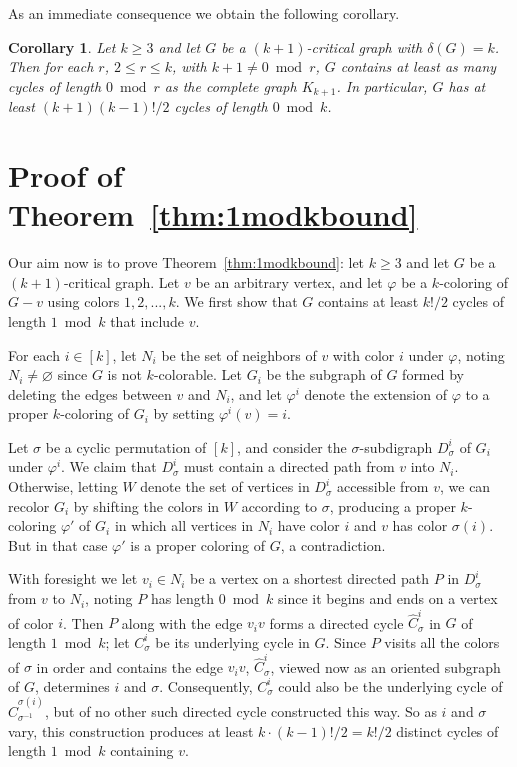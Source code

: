 \documentclass[12pt]{article}
\numberwithin{theorem}{section}
\newtheorem{corollary}[theorem]{Corollary}
\begin{document}
    As an immediate consequence we obtain the following corollary.

\begin{corollary}
\label{cor:0modkwithmindeg}
    Let $k \ge 3$ and let $G$ be a $(k+1)$-critical graph with $\delta (G) = k$. Then for each $r$, $2 \le r \le k$, with $k+1 \ne 0 \bmod r$, $G$ contains at least as many cycles of length $0\bmod r$ as the complete graph $K_{k+1}$.  In particular, $G$ has at least $(k+1)(k-1)!/2$ cycles of length $0 \bmod k$.
\end{corollary}




\section{Proof of Theorem~\ref{thm:1modkbound}}
\label{sec:1modk}

Our aim now is to prove Theorem~\ref{thm:1modkbound}: let $k \ge 3$ and let $G$ be a $(k+1)$-critical graph.  Let $v$ be an arbitrary vertex, and let $\varphi$ be a $k$-coloring of $G-v$ using colors $1,2,...,k$. We first show that $G$ contains at least $k!/2$ cycles of length $1 \bmod k$ that include $v$.

For each $i \in [k]$, let $N_i$ be the set of neighbors of $v$ with color $i$ under $\varphi$, noting $N_i \ne \varnothing$ since $G$ is not $k$-colorable. Let $G_i$ be the subgraph of $G$ formed by deleting the edges between $v$ and $N_i$, and let $\varphi^i$ denote the extension of $\varphi$ to a proper $k$-coloring of $G_i$ by setting $\varphi^i(v)=i$.

Let $\sigma$ be a cyclic permutation of $[k]$, and consider the $\sigma$-subdigraph $D^i_{\sigma}$ of $G_i$ under $\varphi^i$. We claim that $D^i_{\sigma}$ must contain a directed path from $v$ into $N_i$.  Otherwise, letting $W$ denote the set of vertices in $D^i_{\sigma}$ accessible from $v$, we can recolor $G_i$ by shifting the colors in $W$ according to $\sigma$, producing a proper $k$-coloring $\varphi'$ of $G_i$ in which all vertices in $N_i$ have color $i$ and $v$ has color $\sigma(i)$. But in that case $\varphi'$ is a proper coloring of $G$, a contradiction.

With foresight we let $v_i \in N_i$ be a vertex on a shortest directed path $P$ in $D_{\sigma}^i$ from $v$ to $N_i$, noting $P$ has length $0 \bmod k$ since it begins and ends on a vertex of color $i$. Then $P$ along with the edge $v_iv$ forms a directed cycle $\widehat{C}_{\sigma}^i$ in $G$ of length $1 \bmod k$; let $C^i_{\sigma}$ be its underlying cycle in $G$.  Since $P$ visits all the colors of $\sigma$ in order and contains the edge $v_iv$, $\widehat{C}_{\sigma}^i$, viewed now as an oriented subgraph of $G$, determines $i$ and $\sigma$. Consequently, $C_{\sigma}^i$ could also be the underlying cycle of $\widehat{C}_{\sigma^{-1}}^{\sigma(i)}$, but of no other such directed cycle constructed this way. So as $i$ and $\sigma$ vary, this construction produces at least $k\cdot (k-1)!/2 = k!/2$ distinct cycles of length $1 \bmod k$ containing $v$.
\end{document}

